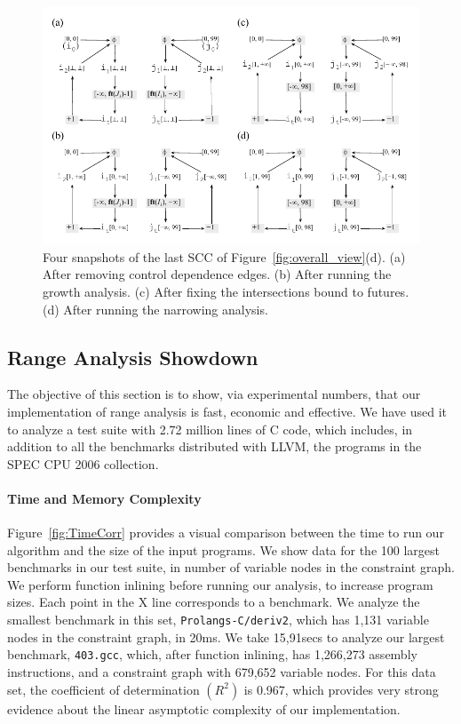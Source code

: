 \documentclass{paper}
\begin{document}
\begin{figure}[t!]
\begin{center}
\includegraphics[width=\textwidth]{images/ex_partition_grow_crop}
\end{center}
\caption{\label{fig:ex_partition_grow_crop}
Four snapshots of the last SCC of Figure~\ref{fig:overall_view}(d).
(a) After removing control dependence edges.
(b) After running the growth analysis.
(c) After fixing the intersections bound to futures.
(d) After running the narrowing analysis.}
\end{figure}

\subsection{Range Analysis Showdown}
\label{sub:showdown}

The objective of this section is to show, via experimental numbers, that our
implementation of range analysis is fast, economic and effective.
We have used it to analyze a test suite with 2.72 million lines of C code,
which includes, in addition to all the benchmarks distributed with LLVM,
the programs in the SPEC CPU 2006 collection.

\paragraph{Time and Memory Complexity}

Figure~\ref{fig:TimeCorr} provides a visual comparison between the time to
run our algorithm and the size of the input programs.
We show data for the 100 largest benchmarks in our test suite, in number
of variable nodes in the constraint graph.
We perform function inlining before running our analysis, to increase program
sizes.
Each point in the X line corresponds to a benchmark.
We analyze the smallest benchmark in this set, \texttt{Prolangs-C/deriv2}, which
has 1,131 variable nodes in the constraint graph, in 20ms.
We take 15,91secs to analyze our largest benchmark, \texttt{403.gcc}, which,
after function inlining, has 1,266,273 assembly instructions, and a
constraint graph with 679,652 variable nodes.
For this data set, the coefficient of determination $(R^2)$ is 0.967, which
provides very strong evidence about the linear asymptotic complexity of our
implementation.
\end{document}
